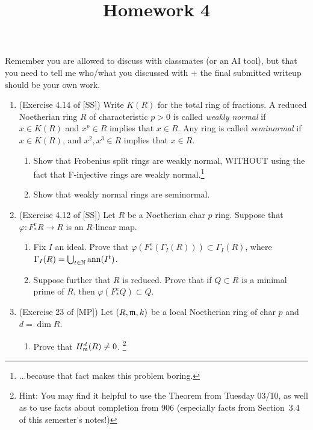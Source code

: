 \documentclass[11pt]{amsart}
\title{Homework 4}
\date{\vspace{-4em}}
\begin{document}
\maketitle\thispagestyle{fancy}

Remember you are allowed to discuss with classmates (or an AI tool), but that you need to tell me who/what you discussed with + the final submitted writeup should be your own work.


\begin{enumerate}[itemsep=1.5em]

\item (Exercise 4.14 of [SS]) Write $K(R)$ for the total ring of fractions. A reduced Noetherian ring $R$ of characteristic $p > 0$ is called
\emph{weakly normal} if $x\in K(R)$ and $x^p \in R$ implies that $x\in R$. Any ring is
called \emph{seminormal} if $x\in K(R)$, and $x^2, x^3 \in R$ implies that $x \in R$. 
\begin{enumerate}
\item Show
that Frobenius split rings are weakly normal, WITHOUT using the fact that F-injective rings are weakly normal.\footnote{...because that fact makes this problem boring.}



\item Show that weakly normal rings
are seminormal. 

\end{enumerate}


\item (Exercise 4.12 of [SS]) Let $R$ be a Noetherian char $p$ ring. Suppose that $\varphi:F_*^eR\to R$ is an $R$-linear map. 
\begin{enumerate}
\item Fix $I$ an ideal. Prove that $\varphi(F_*^e(\Gamma_I(R)))\subset \Gamma_I(R)$, where $\Gamma_I(R) = \bigcup_{t\in \mathbb{N}} \operatorname{ann}(I^t)$.
\item
Suppose further that $R$ is reduced. Prove that if $Q \subset R$ is a minimal prime of $R$, then $\varphi(F_*^eQ)\subset Q$.
\end{enumerate}



\item (Exercise 23 of [MP]) Let $(R,\mathfrak{m},k)$ be a local Noetherian ring of char $p$ and $d=\dim R$. 

\begin{enumerate}
\item Prove that $H^d_{\mathfrak{m}}(R)\ne 0$. \footnote{Hint: You may find it helpful to use the Theorem from Tuesday 03/10, as well as to use facts about completion from 906 (especially facts from Section~3.4 of this semester's notes!)}


\end{enumerate}
\end{enumerate}
\end{document}
